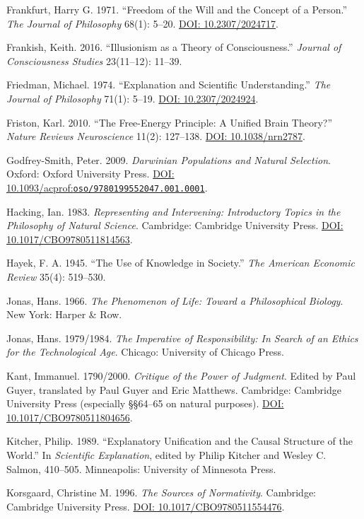 \documentclass[
  english,
  11pt,
  oneside]{book}
\begin{document}
Frankfurt, Harry G. 1971. ``Freedom of the Will and the Concept of a Person.'' \emph{The Journal of Philosophy} 68(1): 5--20. \href{https://doi.org/10.2307/2024717}{DOI: 10.2307/2024717}.

Frankish, Keith. 2016. ``Illusionism as a Theory of Consciousness.'' \emph{Journal of Consciousness Studies} 23(11--12): 11--39.

Friedman, Michael. 1974. ``Explanation and Scientific Understanding.'' \emph{The Journal of Philosophy} 71(1): 5--19. \href{https://doi.org/10.2307/2024924}{DOI: 10.2307/2024924}.

Friston, Karl. 2010. ``The Free-Energy Principle: A Unified Brain Theory?'' \emph{Nature Reviews Neuroscience} 11(2): 127--138. \href{https://doi.org/10.1038/nrn2787}{DOI: 10.1038/nrn2787}.

Godfrey-Smith, Peter. 2009. \emph{Darwinian Populations and Natural Selection}. Oxford: Oxford University Press. \href{https://doi.org/10.1093/acprof:oso/9780199552047.001.0001}{DOI: 10.1093/acprof:\nolinkurl{oso/9780199552047.001.0001}}.

Hacking, Ian. 1983. \emph{Representing and Intervening: Introductory Topics in the Philosophy of Natural Science}. Cambridge: Cambridge University Press. \href{https://doi.org/10.1017/CBO9780511814563}{DOI: 10.1017/CBO9780511814563}.

Hayek, F. A. 1945. ``The Use of Knowledge in Society.'' \emph{The American Economic Review} 35(4): 519--530.

Jonas, Hans. 1966. \emph{The Phenomenon of Life: Toward a Philosophical Biology}. New York: Harper \& Row.

Jonas, Hans. 1979/1984. \emph{The Imperative of Responsibility: In Search of an Ethics for the Technological Age}. Chicago: University of Chicago Press.

Kant, Immanuel. 1790/2000. \emph{Critique of the Power of Judgment}. Edited by Paul Guyer, translated by Paul Guyer and Eric Matthews. Cambridge: Cambridge University Press (especially §§64--65 on natural purposes). \href{https://doi.org/10.1017/CBO9780511804656}{DOI: 10.1017/CBO9780511804656}.

Kitcher, Philip. 1989. ``Explanatory Unification and the Causal Structure of the World.'' In \emph{Scientific Explanation}, edited by Philip Kitcher and Wesley C. Salmon, 410--505. Minneapolis: University of Minnesota Press.

Korsgaard, Christine M. 1996. \emph{The Sources of Normativity}. Cambridge: Cambridge University Press. \href{https://doi.org/10.1017/CBO9780511554476}{DOI: 10.1017/CBO9780511554476}.
\end{document}
